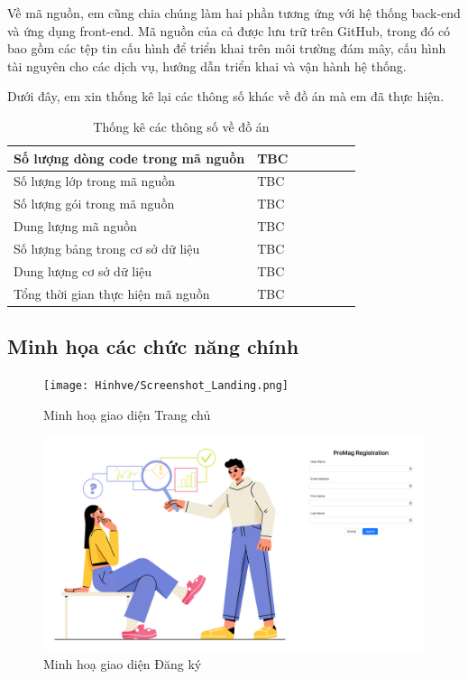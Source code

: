 \documentclass[../DoAn.tex]{subfiles}
\begin{document}
Về mã nguồn, em cũng chia chúng làm hai phần tương ứng với hệ thống back-end và ứng dụng front-end.
Mã nguồn của cả được lưu trữ trên GitHub, trong đó có bao gồm các tệp tin cấu hình để triển khai trên môi trường đám mây, cấu hình
tài nguyên cho các dịch vụ, hướng dẫn triển khai và vận hành hệ thống.

Dưới đây, em xin thống kê lại các thông số khác về đồ án mà em đã thực hiện.

\begin{table}[H]
    \renewcommand{\arraystretch}{1.2}
    \centering{}
    \begin{tabular}{p{0.7\linewidth}p{0.3\linewidth}}
        \hline
        Số lượng dòng code trong mã nguồn & TBC \\ \hline
        Số lượng lớp trong mã nguồn       & TBC \\ \hline
        Số lượng gói trong mã nguồn       & TBC \\ \hline
        Dung lượng mã nguồn               & TBC \\ \hline
        Số lượng bảng trong cơ sở dữ liệu & TBC \\ \hline
        Dung lượng cơ sở dữ liệu          & TBC \\ \hline
        Tổng thời gian thực hiện mã nguồn & TBC \\ \hline
    \end{tabular}
    \renewcommand{\arraystretch}{1}
    \caption{Thống kê các thông số về đồ án}
    \label{fig:project_statistics}
\end{table}

\newpage


\subsection{Minh họa các chức năng chính}
\label{subsection:4.3.3}

\begin{figure}[H]
    \centering
    \texttt{[image: Hinhve/Screenshot\_Landing.png]}
    \caption{Minh hoạ giao diện Trang chủ}
    \label{fig:Screenshot_Landing}
\end{figure}


\begin{figure}[H]
    \centering
    \includegraphics[width=1.0\linewidth]{Hinhve/Screenshot_Register.png}
    \caption{Minh hoạ giao diện Đăng ký}
    \label{fig:Screenshot_Register}
\end{figure}
\end{document}
